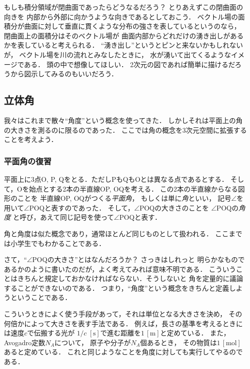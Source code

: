 もしも積分領域が閉曲面であったらどうなるだろう？ とりあえずこの閉曲面の向きを
内部から外部に向かうような向きであるとしておこう．
ベクトル場の面積分が曲面に対して垂直に貫くような分布の強さを表しているというのなら，
閉曲面上の面積分はそのベクトル場が
曲面内部からどれだけの湧き出しがあるかを表していると考えられる．
``湧き出し''というとピンと来ないかもしれないが，
ベクトル場を川の流れとみなしたときに，
水が湧いて出てくるようなイメージである．
頭の中で想像してほしい．
2次元の図であれば簡単に描けるだろうから図示してみるのもいいだろう．
\subsection{立体角}
我々はこれまで散々``角度''という概念を使ってきた．
しかしそれは平面上の角の大きさを測るのに限るのであった．
ここでは角の概念を3次元空間に拡張することを考えよう．

\subsubsection{平面角の復習}
平面上に3点O, P, Qをとる．ただしPもQもOとは異なる点であるとする．
そして，Oを始点とする2本の半直線OP, OQを考える．
この2本の半直線からなる図形のことを
半直線OP, OQがつくる\emph{平面角}，
もしくは単に\emph{角}といい，
記号$\angle$を用いて$\angle \mathrm{POQ}$と表すのであった．
そして，$\angle \mathrm{POQ}$の大きさのことを
$\angle \mathrm{POQ}$の\emph{角度}
と呼び，あえて同じ記号を使って$\angle \mathrm{POQ}$と表す．

角と角度は似た概念であり，通常ほとんど同じものとして扱われる．
ここまでは小学生でもわかることである．

さて，``$\angle \mathrm{POQ}$の大きさ''とはなんだろうか？ さっきはしれっと
明らかなものであるかのように書いたのだが，よく考えてみれば意味不明である．
こういうことはきちんと規定しておかなければならない．そうしないと
角を定量的に議論することができないのである．
つまり，``角度''という概念をきちんと定義しようということである．

こういうときによく使う手段があって，それは単位となる大きさを決め，
その何倍かによって大きさを表す手法である．
例えば，長さの基準を考えるときには速度$c$で伝搬する光が
$1/c \; [\mathrm{s}]$で進む距離を$1\, [\mathrm{m}]$と定めている．
また，Avogadro定数$N_A$について，
原子や分子が$N_A$個あるとき，
その物質は$1 \, [\mathrm{mol}]$あると定めている．
これと同じようなことを角度に対しても実行してやるのである．

